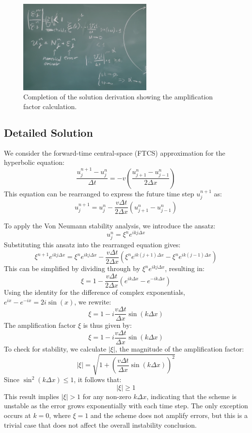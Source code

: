 \documentclass{article}
\begin{document}
\begin{figure} [h!]
    \centering
    \includegraphics[width=0.6\textwidth]{materials/ph2.jpg}
    \caption{Completion of the solution derivation showing the amplification factor calculation.}
    \label{fig:ph2}
\end{figure}

\subsection{Detailed Solution}
We consider the forward-time central-space (FTCS) approximation for the hyperbolic equation:
\[
\frac{u_j^{n+1} - u_j^n}{\Delta t} = -v \left(\frac{u_{j+1}^n - u_{j-1}^n}{2\Delta x}\right)
\]
This equation can be rearranged to express the future time step \( u_j^{n+1} \) as:
\[
u_j^{n+1} = u_j^n - \frac{v\Delta t}{2\Delta x} \left(u_{j+1}^n - u_{j-1}^n\right)
\]

To apply the Von Neumann stability analysis, we introduce the ansatz:
\[
u_j^n = \xi^n e^{ikj\Delta x}
\]
Substituting this ansatz into the rearranged equation gives:
\[
\xi^{n+1} e^{ikj\Delta x} = \xi^n e^{ikj\Delta x} - \frac{v\Delta t}{2\Delta x} \left(\xi^n e^{ik(j+1)\Delta x} - \xi^n e^{ik(j-1)\Delta x}\right)
\]
This can be simplified by dividing through by \( \xi^n e^{ikj\Delta x} \), resulting in:
\[
\xi = 1 - \frac{v\Delta t}{2\Delta x} \left(e^{ik\Delta x} - e^{-ik\Delta x}\right)
\]
Using the identity for the difference of complex exponentials, \( e^{ix} - e^{-ix} = 2i\sin(x) \), we rewrite:
\[
\xi = 1 - i \frac{v\Delta t}{\Delta x} \sin(k\Delta x)
\]
The amplification factor \( \xi \) is thus given by:
\[
\xi = 1 - i \frac{v\Delta t}{\Delta x} \sin(k\Delta x)
\]
To check for stability, we calculate \( |\xi| \), the magnitude of the amplification factor:
\[
|\xi| = \sqrt{1 + \left(\frac{v\Delta t}{\Delta x} \sin(k\Delta x)\right)^2}
\]
Since \( \sin^2(k\Delta x) \leq 1 \), it follows that:
\[
|\xi| \geq 1
\]
This result implies \( |\xi| > 1 \) for any non-zero \( k\Delta x \), indicating that the scheme is unstable as the error grows exponentially with each time step. The only exception occurs at \( k = 0 \), where \( \xi = 1 \) and the scheme does not amplify errors, but this is a trivial case that does not affect the overall instability conclusion.
\end{document}
